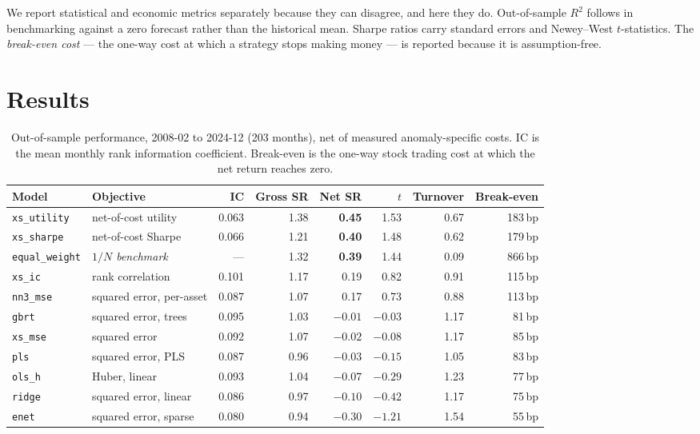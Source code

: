 \documentclass[11pt,a4paper]{article}
\begin{document}
We report statistical and economic metrics separately because they can disagree,
and here they do. Out-of-sample $R^2$ follows \citet{GuKellyXiu2020} in
benchmarking against a zero forecast rather than the historical mean. Sharpe
ratios carry \citet{Lo2002} standard errors and Newey--West $t$-statistics. The
\emph{break-even cost} --- the one-way cost at which a strategy stops making money
--- is reported because it is assumption-free.

\section{Results}

\begin{table}[t]
\centering\small
\caption{Out-of-sample performance, 2008-02 to 2024-12 (203 months), net of
measured anomaly-specific costs. IC is the mean monthly rank information
coefficient. Break-even is the one-way stock trading cost at which the net return
reaches zero.}
\label{tab:main}
\begin{tabular}{llrrrrrr}
\toprule
Model & Objective & IC & Gross SR & \textbf{Net SR} & $t$ & Turnover & Break-even \\
\midrule
\texttt{xs\_utility}  & net-of-cost utility & 0.063 & 1.38 & \textbf{0.45} & 1.53 & 0.67 & 183\,bp \\
\texttt{xs\_sharpe}   & net-of-cost Sharpe  & 0.066 & 1.21 & \textbf{0.40} & 1.48 & 0.62 & 179\,bp \\
\rowcolor{black!7}
\texttt{equal\_weight}& \emph{$1/N$ benchmark} & --- & 1.32 & \textbf{0.39} & 1.44 & 0.09 & 866\,bp \\
\texttt{xs\_ic}       & rank correlation    & 0.101 & 1.17 & 0.19 & 0.82 & 0.91 & 115\,bp \\
\texttt{nn3\_mse}     & squared error, per-asset & 0.087 & 1.07 & 0.17 & 0.73 & 0.88 & 113\,bp \\
\texttt{gbrt}         & squared error, trees & 0.095 & 1.03 & $-0.01$ & $-0.03$ & 1.17 & 81\,bp \\
\texttt{xs\_mse}      & squared error       & 0.092 & 1.07 & $-0.02$ & $-0.08$ & 1.17 & 85\,bp \\
\texttt{pls}          & squared error, PLS  & 0.087 & 0.96 & $-0.03$ & $-0.15$ & 1.05 & 83\,bp \\
\texttt{ols\_h}       & Huber, linear       & 0.093 & 1.04 & $-0.07$ & $-0.29$ & 1.23 & 77\,bp \\
\texttt{ridge}        & squared error, linear & 0.086 & 0.97 & $-0.10$ & $-0.42$ & 1.17 & 75\,bp \\
\texttt{enet}         & squared error, sparse & 0.080 & 0.94 & $-0.30$ & $-1.21$ & 1.54 & 55\,bp \\
\bottomrule
\end{tabular}
\end{table}
\end{document}
